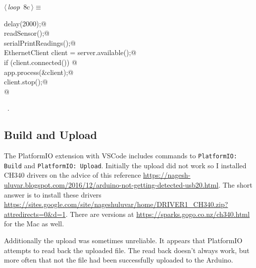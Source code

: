\documentclass[a4paper, 11pt]{article}
\begin{document}
\begin{flushleft} \small
\begin{minipage}{\linewidth}\label{scrap12}\raggedright\small
{}$\langle\,${\itshape loop}\nobreak\ {\footnotesize{8c}}$\,\rangle\equiv$
\vspace{-1ex}
\begin{list}{}{\setlength{\leftmargin}{1em}} \item
\mbox{}\lstinline@  delay(2000);@\\
\mbox{}\lstinline@  readSensor();@\\
\mbox{}\lstinline@  serialPrintReadings();@\\
\mbox{}\lstinline@  EthernetClient client = server.available();@\\
\mbox{}\lstinline@  if (client.connected()) {@\\
\mbox{}\lstinline@    app.process(&client);@\\
\mbox{}\lstinline@    client.stop();@\\
\mbox{}\lstinline@  }@\\
\mbox{}{\NWsep}
\end{list}
\vspace{-1ex}
\vspace{-1ex}
\footnotesize
\begin{list}{}{\setlength{\itemsep}{-\parsep}\setlength{\itemindent}{-\leftmargin}}
\item \NWtxtMacroRefIn\ .
\end{list}
\end{minipage}
\end{flushleft}

\subsection{Build and Upload}

The PlatformIO extension with VSCode includes
commands to 
\verb|PlatformIO: Build|
and
\verb|PlatformIO: Upload|.
Initially the upload did not work so I installed CH340 drivers
on the advice of this reference \url{https://nagesh-uluvar.blogspot.com/2016/12/arduino-not-getting-detected-usb20.html}.
The short answer is to install these drivers \url{https://sites.google.com/site/nageshuluvar/home/DRIVER1_CH340.zip?attredirects=0&d=1}.
There are versions at \url{https://sparks.gogo.co.nz/ch340.html} for the Mac as well.

Additionally the upload was sometimes unreliable.
It appears that PlatformIO attempts to read back the uploaded file.
The read back doesn't always work,
but more often that not the file had been successfully uploaded to the Arduino.
\end{document}
